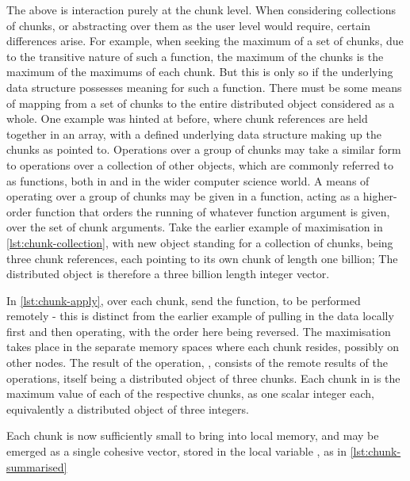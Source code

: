 The above is interaction purely at the chunk level.
When considering collections of chunks, or abstracting over them as the user level would require, certain differences arise.
For example, when seeking the maximum of a set of chunks, due to the transitive nature of such a function, the maximum of the chunks is the maximum of the maximums of each chunk.
But this is only so if the underlying data structure possesses meaning for such a function.
There must be some means of mapping from a set of chunks to the entire distributed object considered as a whole.
One example was hinted at before, where chunk references are held together in an array, with a defined underlying data structure making up the chunks as pointed to.
Operations over a group of chunks may take a similar form to operations over a collection of other objects, which are commonly referred to as  functions, both in \R{} and in the wider computer science world.
A means of operating over a group of chunks may be given in a  function, acting as a higher-order function that orders the running of whatever function argument is given, over the set of chunk arguments.
Take the earlier example of maximisation in \cref{lst:chunk-collection}, with new object  standing for a collection of chunks, being three chunk references, each pointing to its own chunk of length one billion; The distributed object is therefore a three billion length integer vector.


In \cref{lst:chunk-apply}, over each chunk, send the  function, to be performed remotely - this is distinct from the earlier example of pulling in the data locally first and then operating, with the order here being reversed.
The maximisation takes place in the separate memory spaces where each chunk resides, possibly on other nodes.
The result of the operation, , consists of the remote results of the operations, itself being a distributed object of three chunks.
Each chunk in  is the maximum value of each of the respective  chunks, as one scalar integer each, equivalently a distributed object of three integers.


Each chunk is now sufficiently small to bring into local memory, and may be emerged as a single cohesive vector, stored in the local variable , as in \cref{lst:chunk-summarised}


